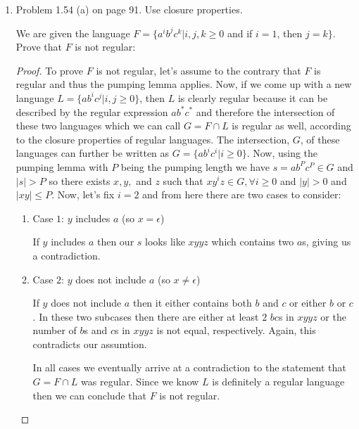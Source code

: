 \documentclass[11pt]{article}
\begin{document}
\begin{enumerate}
\begin{enumerate}
\begin{proof}
\begin{enumerate}
\end{enumerate}

\end{proof}

\end{enumerate}

Collaborators: Derek O'Connell

\item
Problem 1.54 (a) on page 91. Use closure properties.

We are given the language $F = \{ a^i b^j c^k | i,j,k \geq 0$ and if $i = 1$, then $j = k \}$.  
Prove that $F$ is not regular:

\begin{proof}

To prove $F$ is not regular, let's assume to the contrary that $F$ is regular and thus the pumping lemma applies.  Now, if we come up with a new language $L = \{ a b^i c^j | i,j \geq 0 \}$, then $L$ is clearly regular because it can be described by the regular expression $a b^* c^*$ and therefore the intersection of these two languages which we can call $G = F \cap L$ is regular as well, according to the closure properties of regular languages.  The intersection, $G$, of these languages can further be written as $G = \{ a b^i c^i | i \geq 0 \}$.  Now, using the pumping lemma with $P$ being the pumping length we have $s = ab^Pc^P \in G$ and $|s| > P$ so there exists $x,y,$ and $z$ such that $xy^iz \in G, \forall i \geq 0$ and $|y| > 0$ and $|xy| \leq P$.  Now, let's fix $i=2$ and from here there are two cases to consider:

\begin{enumerate}
\item
Case $1$: $y$ includes $a$ (so $x=\epsilon$)

If $y$ includes $a$ then our $s$ looks like $xyyz$ which contains two $a$s, giving us a contradiction.  

\item
Case $2$: $y$ does not include $a$ (so $x \neq \epsilon$)

If $y$ does not include $a$ then it either contains both $b$ and $c$ or either $b$ or $c$.  In these two subcases then there are either at least $2$ $bc$s in $xyyz$ or the number of $b$s and $c$s in $xyyz$ is not equal, respectively.  Again, this contradicts our assumtion.  

In all cases we eventually arrive at a contradiction to the statement that $G = F \cap L$ was regular.  Since we know $L$ is definitely a regular language then we can conclude that $F$ is not regular.  

\end{enumerate}

\end{proof}

\end{enumerate}
\end{document}
